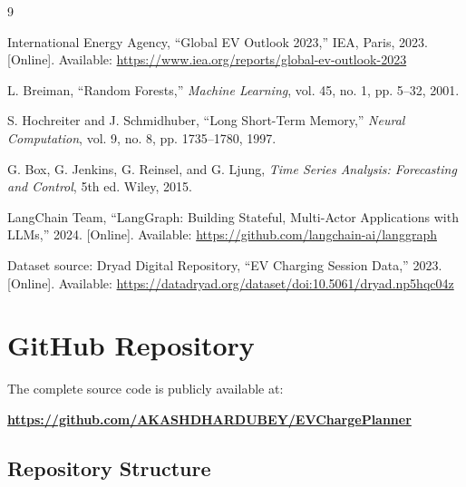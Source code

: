 \documentclass[conference]{IEEEtran}
\begin{document}
\begin{thebibliography}{9}

International Energy Agency, ``Global EV Outlook 2023,'' IEA, Paris, 2023. [Online]. Available: \url{https://www.iea.org/reports/global-ev-outlook-2023}

L. Breiman, ``Random Forests,'' \textit{Machine Learning}, vol. 45, no. 1, pp. 5--32, 2001.

S. Hochreiter and J. Schmidhuber, ``Long Short-Term Memory,'' \textit{Neural Computation}, vol. 9, no. 8, pp. 1735--1780, 1997.

G. Box, G. Jenkins, G. Reinsel, and G. Ljung, \textit{Time Series Analysis: Forecasting and Control}, 5th ed. Wiley, 2015.

LangChain Team, ``LangGraph: Building Stateful, Multi-Actor Applications with LLMs,'' 2024. [Online]. Available: \url{https://github.com/langchain-ai/langgraph}

Dataset source: Dryad Digital Repository, ``EV Charging Session Data,'' 2023. [Online]. Available: \url{https://datadryad.org/dataset/doi:10.5061/dryad.np5hqc04z}

\end{thebibliography}

\appendix

\section{GitHub Repository}

The complete source code is publicly available at:

\begin{center}
\textbf{\url{https://github.com/AKASHDHARDUBEY/EVChargePlanner}}
\end{center}

\subsection{Repository Structure}
\end{document}
